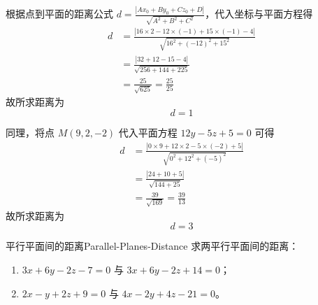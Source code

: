 \begin{solution}

    根据点到平面的距离公式 $d = \frac{|Ax_0 + By_0 + Cz_0 + D|}{\sqrt{A^2 + B^2 + C^2}}$，代入坐标与平面方程得
    \begin{equation}
        \begin{aligned}
            d & = \frac{|16 \times 2 - 12 \times (-1) + 15 \times (-1) - 4|}{\sqrt{16^2 + (-12)^2 + 15^2}} \\
              & = \frac{|32 + 12 - 15 - 4|}{\sqrt{256 + 144 + 225}}                                        \\
              & = \frac{25}{\sqrt{625}} = \frac{25}{25}
        \end{aligned}
    \end{equation}
    故所求距离为
    \begin{equation}
        \boxed{d = 1}
    \end{equation}


    同理，将点 $M(9, 2, -2)$ 代入平面方程 $12y - 5z + 5 = 0$ 可得
    \begin{equation}
        \begin{aligned}
            d & = \frac{|0 \times 9 + 12 \times 2 - 5 \times (-2) + 5|}{\sqrt{0^2 + 12^2 + (-5)^2}} \\
              & = \frac{|24 + 10 + 5|}{\sqrt{144 + 25}}                                             \\
              & = \frac{39}{\sqrt{169}} = \frac{39}{13}
        \end{aligned}
    \end{equation}
    故所求距离为
    \begin{equation}
        \boxed{d = 3}
    \end{equation}
\end{solution}


\begin{problem}{平行平面间的距离}{Parallel-Planes-Distance}
    求两平行平面间的距离：
    \begin{enumerate}
        \item $3x + 6y - 2z - 7 = 0$ 与 $3x + 6y - 2z + 14 = 0$；
        \item $2x - y + 2z + 9 = 0$ 与 $4x - 2y + 4z - 21 = 0$。
    \end{enumerate}
\end{problem}

